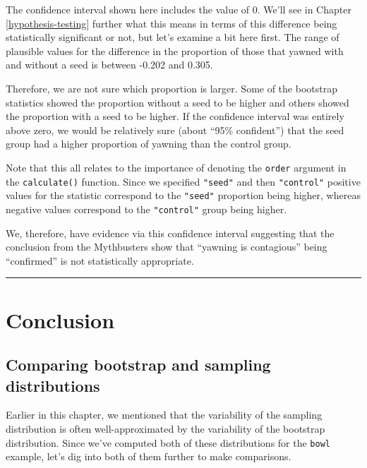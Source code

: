 \documentclass[12pt, krantz2,]{krantz}
\begin{document}
The confidence interval shown here includes the value of 0. We'll see in Chapter \ref{hypothesis-testing} further what this means in terms of this difference being statistically significant or not, but let's examine a bit here first. The range of plausible values for the difference in the proportion of those that yawned with and without a seed is between -0.202 and 0.305.

Therefore, we are not sure which proportion is larger. Some of the bootstrap statistics showed the proportion without a seed to be higher and others showed the proportion with a seed to be higher. If the confidence interval was entirely above zero, we would be relatively sure (about ``95\% confident'') that the seed group had a higher proportion of yawning than the control group.

Note that this all relates to the importance of denoting the \texttt{order} argument in the \texttt{calculate()} function. Since we specified \texttt{"seed"} and then \texttt{"control"} positive values for the statistic correspond to the \texttt{"seed"} proportion being higher, whereas negative values correspond to the \texttt{"control"} group being higher.

We, therefore, have evidence via this confidence interval suggesting that the conclusion from the Mythbusters show that ``yawning is contagious'' being ``confirmed'' is not statistically appropriate.

\begin{center}\rule{0.5\linewidth}{\linethickness}\end{center}

\hypertarget{ci-conclusion}{%
\section{Conclusion}\label{ci-conclusion}}

\hypertarget{comparing-bootstrap-and-sampling-distributions}{%
\subsection{Comparing bootstrap and sampling distributions}\label{comparing-bootstrap-and-sampling-distributions}}

Earlier in this chapter, we mentioned that the variability of the sampling distribution is often well-approximated by the variability of the bootstrap distribution. Since we've computed both of these distributions for the \texttt{bowl} example, let's dig into both of them further to make comparisons.
\end{document}
